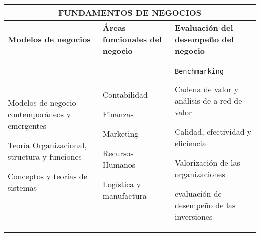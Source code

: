 \begin{center}
\begin{tabularx}{\textwidth}{|X|X|X|} \hline
\multicolumn{3}{|c|}{\textbf{FUNDAMENTOS DE NEGOCIOS}} \\ \hline
\textbf{Modelos de negocios} & \textbf{Áreas funcionales del negocio} & \textbf{Evaluación del desempeño del negocio} \\ \hline

\begin{capenv}
\item Modelos de negocio contemporáneos y emergentes
\item Teoría Organizacional, structura y funciones
\item Conceptos y teorías de sistemas
\end{capenv}
&
\begin{capenv}
\item Contabilidad
\item Finanzas
\item Marketing
\item Recursos Humanos
\item Logística y manufactura
\end{capenv}
&
\begin{capenv}
\item \texttt{Benchmarking}
\item Cadena de valor y análisis de a red de valor 
\item Calidad, efectividad y eficiencia
\item Valorización de las organizaciones
\item evaluación de desempeño de las inversiones
\end{capenv} \\ \hline

\end{tabularx}
\end{center}

